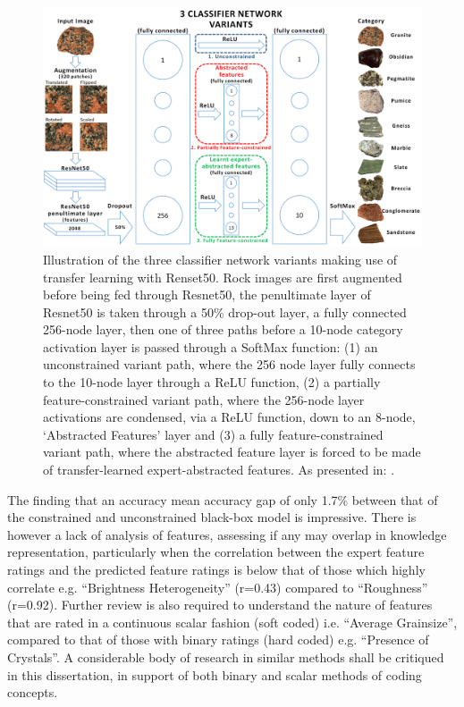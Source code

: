 \begin{figure}[H]
  \centering
    \includegraphics[width=\textwidth]{images/Figure1 - Networks 1-3.png}
    \caption{Illustration of the three classifier network variants making use of transfer learning with Renset50. Rock images are first augmented before being fed through Resnet50, the penultimate layer of Resnet50 is taken through a 50\% drop-out layer, a fully connected 256-node layer, then one of three paths before a 10-node category activation layer is passed through a SoftMax function: (1) an unconstrained variant path, where the 256 node layer fully connects to the 10-node layer through a ReLU function, (2) a partially feature-constrained variant path, where the 256-node layer activations are condensed, via a ReLU function, down to an 8-node, ‘Abstracted Features’ layer and (3) a fully feature-constrained variant path, where the abstracted feature layer is forced to be made of transfer-learned expert-abstracted features. As presented in: \cite{grangeXAISelfexplanatoryAI2022}.}\label{fig:Networks 1-3 XAI&I}
\end{figure}

The finding that an accuracy mean accuracy gap of only 1.7\% between that of the constrained and unconstrained black-box model is impressive. There is however a lack of analysis of features, assessing if any may overlap in knowledge representation, particularly when the correlation between the expert feature ratings and the predicted feature ratings is below that of those which highly correlate e.g. “Brightness Heterogeneity” (r=0.43) compared to “Roughness” (r=0.92).  Further review is also required to understand the nature of features that are rated in a continuous scalar fashion (soft coded) i.e. “Average Grainsize”, compared to that of those with binary ratings (hard coded) e.g. “Presence of Crystals”. A considerable body of research in similar methods shall be critiqued in this dissertation, in support of both binary and scalar methods of coding concepts. 

